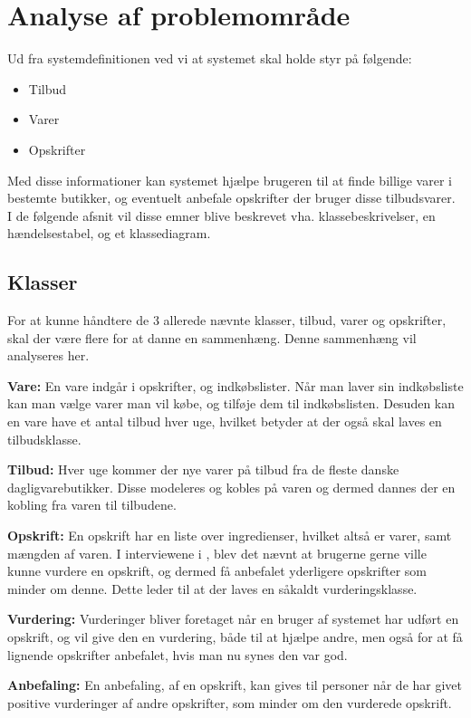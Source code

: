 \section{Analyse af problemområde}

Ud fra systemdefinitionen ved vi at systemet skal holde styr på følgende:

\begin{itemize}
	\item Tilbud
	\item Varer
	\item Opskrifter
\end{itemize}

Med disse informationer kan systemet hjælpe brugeren til at finde billige varer i bestemte butikker, og eventuelt anbefale opskrifter der bruger disse tilbudsvarer.
I de følgende afsnit vil disse emner blive beskrevet vha. klassebeskrivelser, en hændelsestabel, og et klassediagram.

\subsection{Klasser}
For at kunne håndtere de 3 allerede nævnte klasser, tilbud, varer og opskrifter, skal der være flere for at danne en sammenhæng.
Denne sammenhæng vil analyseres her.

\textbf{Vare:}
En vare indgår i opskrifter, og indkøbslister.
Når man laver sin indkøbsliste kan man vælge varer man vil købe, og tilføje dem til indkøbslisten.
Desuden kan en vare have et antal tilbud hver uge, hvilket betyder at der også skal laves en tilbudsklasse.

\textbf{Tilbud:}
Hver uge kommer der nye varer på tilbud fra de fleste danske dagligvarebutikker. 
Disse modeleres og kobles på varen og dermed dannes der en kobling fra varen til tilbudene.

\textbf{Opskrift:}
En opskrift har en liste over ingredienser, hvilket altså er varer, samt mængden af varen. 
I interviewene i , blev det nævnt at brugerne gerne ville kunne vurdere en opskrift, og dermed få anbefalet yderligere opskrifter som minder om denne.
Dette leder til at der laves en såkaldt vurderingsklasse.

\textbf{Vurdering:}
Vurderinger bliver foretaget når en bruger af systemet har udført en opskrift, og vil give den en vurdering, både til at hjælpe andre, men også for at få lignende opskrifter anbefalet, hvis man nu synes den var god.

\textbf{Anbefaling:}
En anbefaling, af en opskrift, kan gives til personer når de har givet positive vurderinger af andre opskrifter, som minder om den vurderede opskrift.

